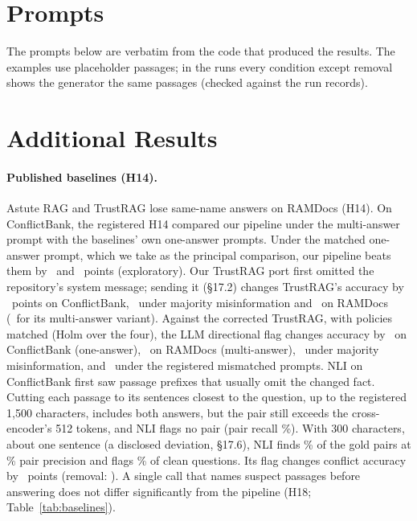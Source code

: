 \section{Prompts}
\label{app:prompts}
The prompts below are verbatim from the code that produced the results. The examples use placeholder passages; in the runs every condition except removal shows the generator the same passages (checked against the run records).


\section{Additional Results}
\label{app:extra}

\paragraph{Published baselines (H14).} Astute RAG \citep{wang2025astute} and TrustRAG \citep{zhou2025trustrag} lose same-name answers
on RAMDocs (H14). On ConflictBank, the registered H14 compared our pipeline under the multi-answer prompt with the
baselines' own one-answer prompts. Under the matched one-answer prompt, which we take as the principal comparison, our pipeline beats them by
\hFourteenMatchedAst\ and \hFourteenMatchedTr\ points (exploratory). Our TrustRAG port
first omitted the repository's system message; sending it (\S17.2) changes TrustRAG's accuracy by \blTrustSysCb\
points on ConflictBank, \blTrustSysMj\ under majority misinformation and \blTrustSysRd\ on RAMDocs (\blTrustSysRdMulti\
for its multi-answer variant). Against the corrected TrustRAG, with policies matched (Holm over the four), the LLM
directional flag changes accuracy by \blHFourteenCbs\ on ConflictBank (one-answer), \blHFourteenRd\ on RAMDocs (multi-answer),
\blHFourteenMj\ under majority misinformation, and \blHFourteenCb\ under the registered mismatched prompts.
NLI on ConflictBank first saw passage prefixes that usually omit the changed fact. Cutting each passage to its
sentences closest to the question, up to the registered 1,500 characters, includes both answers, but the
pair still exceeds the cross-encoder's 512 tokens, and NLI flags no pair (pair recall \detNliWinRecall\%). With
300 characters, about one sentence (a disclosed deviation, \S17.6), NLI finds \detNliSentRecall\% of the gold pairs at
\detNliSentPrec\% pair precision and flags \detNliSentCleanFpr\% of clean questions. Its flag changes conflict
accuracy by \blNliSentFlag\ points (removal: \blNliSentRem). A single call that names suspect passages before
answering does not differ significantly from the pipeline (H18; Table~\ref{tab:baselines}).

